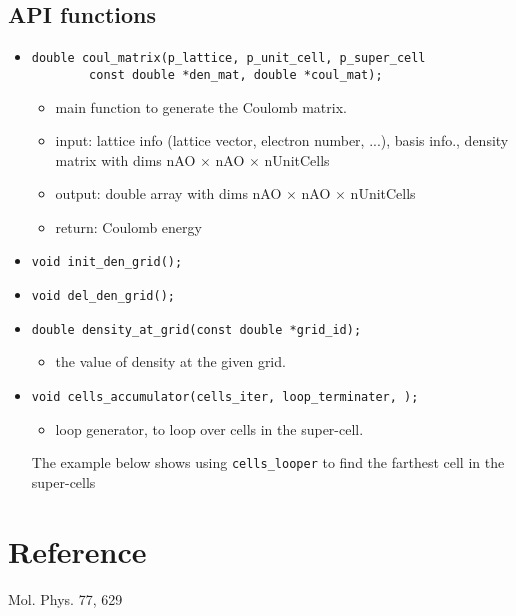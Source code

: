\documentclass{article}
\begin{document}
\subsection{API functions}
\begin{itemize}
  \item
\begin{verbatim}
double coul_matrix(p_lattice, p_unit_cell, p_super_cell
        const double *den_mat, double *coul_mat);
\end{verbatim}
\begin{itemize}
  \item main function to generate the Coulomb matrix.
  \item input: lattice info (lattice vector, electron number, ...), basis
    info., density matrix with dims nAO $\times$ nAO $\times$ nUnitCells
  \item output: double array with dims nAO $\times$ nAO $\times$ nUnitCells
  \item return: Coulomb energy
\end{itemize}

\item \verb$void init_den_grid();$

\item \verb$void del_den_grid();$

\item \verb$double density_at_grid(const double *grid_id);$
\begin{itemize}
  \item the value of density at the given grid.
\end{itemize}

\item \verb$void cells_accumulator(cells_iter, loop_terminater, );$
\begin{itemize}
  \item loop generator, to loop over cells in the super-cell.
\end{itemize}
The example below shows using \verb$cells_looper$ to find the farthest cell in
the super-cells
\end{itemize}

\section{Reference}
Mol. Phys. 77, 629
\end{document}
